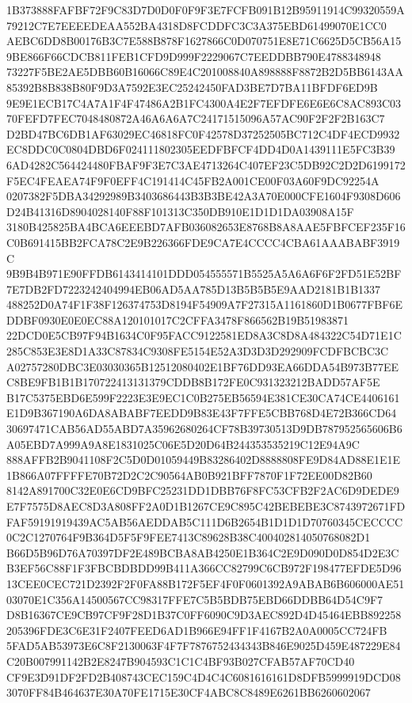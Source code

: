 \documentclass[UTF8,fontset=fandol,zihao=-4,a4paper]{ctexart}
\begin{document}
{{1B373888FAFBF72F9C83D7D0D0F0F9F3E7FCFB091B12B95911914C99320559A79212C7E7EEEEDEAA552BA4318D8FCDDFC3C3A375EBD61499070E1CC0
AEBC6DD8B00176B3C7E588B878F1627866C0D070751E8E71C6625D5CB56A159BE866F66CDCB811FEB1CFD9D999F2229067C7EEDDBB790E4788348948
73227F5BE2AE5DBB60B16066C89E4C201008840A898888F8872B2D5BB6143AA85392B8B838B80F9D3A7592E3EC25242450FAD3BE7D7BA11BFDF6ED9B
9E9E1ECB17C4A7A1F4F47486A2B1FC4300A4E2F7EFDFE6E6E6C8AC893C0370FEFD7FEC7048480872A46A6A6A7C24171515096A57AC90F2F2F2B163C7
D2BD47BC6DB1AF63029EC46818FC0F42578D37252505BC712C4DF4ECD9932EC8DDC0C0804DBD6F024111802305EEDFBFCF4DD4D0A1439111E5FC3B39
6AD4282C564424480FBAF9F3E7C3AE4713264C407EF23C5DB92C2D2D6199172F5EC4FEAEA74F9F0EFF4C191414C45FB2A001CE00F03A60F9DC92254A
0207382F5DBA34292989B3403686443B3B3BE42A3A70E000CFE1604F9308D606D24B41316D8904028140F88F101313C350DB910E1D1D1DA03908A15F
3180B425825BA4BCA6EEEBD7AFB036082653E8768B8A8AAE5FBFCEF235F16C0B691415BB2FCA78C2E9B226366FDE9CA7E4CCCC4CBA61AAABABF3919C
9B9B4B971E90FFDB6143414101DDD054555571B5525A5A6A6F6F2FD51E52BF7E7DB2FD7223242404994EB06AD5AA785D13B5B5B5E9AAD2181B1B1337
488252D0A74F1F38F126374753D8194F54909A7F27315A1161860D1B0677FBF6EDDBF0930E0E0EC88A120101017C2CFFA3478F866562B19B51983871
22DCD0E5CB97F94B1634C0F95FACC9122581ED8A3C8D8A484322C54D71E1C285C853E3E8D1A33C87834C9308FE5154E52A3D3D3D292909FCDFBCBC3C
A02757280DBC3E03030365B12512080402E1BF76DD93EA66DDA54B973B77EEC8BE9FB1B1B170722413131379CDDB8B172FE0C931323212BADD57AF5E
B17C5375EBD6E599F2223E3E9EC1C0B275EB56594E381CE30CA74CE4406161E1D9B367190A6DA8ABABF7EEDD9B83E43F7FFE5CBB768D4E72B366CD64
30697471CAB56AD55ABD7A35962680264CF78B39730513D9DB787952565606B6A05EBD7A999A9A8E1831025C06E5D20D64B244353535219C12E94A9C
888AFFB2B9041108F2C5D0D01059449B83286402D8888808FE9D84AD88E1E1E1B866A07FFFFE70B72D2C2C90564AB0B921BFF7870F1F72EE00D82B60
8142A891700C32E0E6CD9BFC25231DD1DBB76F8FC53CFB2F2AC6D9DEDE9E7F7575D8AEC8D3A808FF2A0D1B1267CE9C895C42BEBEBE3C8743972671FD
FAF59191919439AC5AB56AEDDAB5C111D6B2654B1D1D1D70760345CECCCC0C2C1270764F9B364D5F5F9FEE7413C89628B38C400402814050768082D1
B66D5B96D76A70397DF2E489BCBA8AB4250E1B364C2E9D090D0D854D2E3CB3EF56C88F1F3FBCBDBDD99B411A366CC82799C6CB972F198477EFDE5D96
13CEE0CEC721D2392F2F0FA88B172F5EF4F0F0601392A9ABAB6B606000AE5103070E1C356A14500567CC98317FFE7C5B5BDB75EBD66DDBB64D54C9F7
D8B16367CE9CB97CF9F28D1B37C0FF6090C9D3AEC892D4D45464EBB892258205396FDE3C6E31F2407FEED6AD1B966E94FF1F4167B2A0A0005CC724FB
5FAD5AB53973E6C8F2130063F4F7F7876752434343B846E9025D459E487229E84C20B007991142B2E8247B904593C1C1C4BF93B027CFAB57AF70CD40
CF9E3D91DF2FD2B408743CEC159C4D4C4C6081616161D8DFB5999919DCD083070FF84B464637E30A70FE1715E30CF4ABC8C8489E6261BB6260602067
}}
\end{document}
